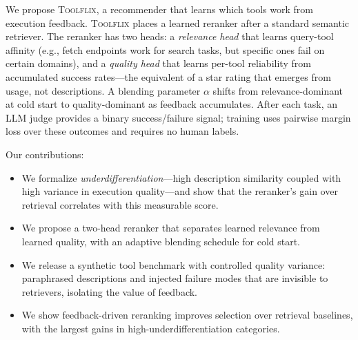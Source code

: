 We propose \textsc{Toolflix}, a recommender that learns which tools work from execution feedback. \textsc{Toolflix} places a learned reranker after a standard semantic retriever. The reranker has two heads: a \emph{relevance head} that learns query-tool affinity (e.g., fetch endpoints work for search tasks, but specific ones fail on certain domains), and a \emph{quality head} that learns per-tool reliability from accumulated success rates---the equivalent of a star rating that emerges from usage, not descriptions. A blending parameter $\alpha$ shifts from relevance-dominant at cold start to quality-dominant as feedback accumulates. After each task, an LLM judge provides a binary success/failure signal; training uses pairwise margin loss over these outcomes and requires no human labels.



Our contributions:
\begin{itemize}
    \item We formalize \emph{underdifferentiation}---high description similarity coupled with high variance in execution quality---and show that the reranker's gain over retrieval correlates with this measurable score.
    \item We propose a two-head reranker that separates learned relevance from learned quality, with an adaptive blending schedule for cold start.
    \item We release a synthetic tool benchmark with controlled quality variance: paraphrased descriptions and injected failure modes that are invisible to retrievers, isolating the value of feedback.
    \item We show feedback-driven reranking improves selection over retrieval baselines, with the largest gains in high-underdifferentiation categories.
\end{itemize}
